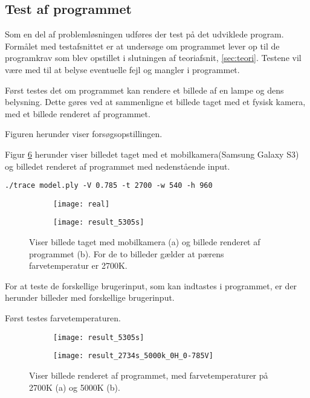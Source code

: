 \subsection{Test af programmet}
\label{sec:test}

Som en del af problemløsningen udføres der test på det udviklede program. Formålet med testafsnittet er at undersøge om programmet lever op til de programkrav som blev opstillet i slutningen af teoriafsnit, \ref{sec:teori}. Testene vil være med til at belyse eventuelle fejl og mangler i programmet.

Først testes det om programmet kan rendere et billede af en lampe og dens belysning. Dette gøres ved at sammenligne et billede taget med et fysisk kamera, med et billede renderet af programmet.

Figuren herunder viser forsøgsopstillingen.


Figur \ref{fig:test_real_fake} herunder viser billedet taget med et mobilkamera(Samsung Galaxy S3) og billedet renderet af programmet med nedenstående input.
\begin{lstlisting}
./trace model.ply -V 0.785 -t 2700 -w 540 -h 960
\end{lstlisting}

\begin{figure}[H]
\centering
\begin{subfigure}{.5\textwidth}
  \centering
  \texttt{[image: real]}
  \caption{}
  \label{fig:real}
\end{subfigure}%
\begin{subfigure}{.5\textwidth}
  \centering
  \texttt{[image: result\_5305s]}
  \caption{}
  \label{fig:fake}
\end{subfigure}
\caption{Viser billede taget med mobilkamera (a) og billede renderet af programmet (b). For de to billeder gælder at pærens farvetemperatur er 2700K.}
\label{fig:test_real_fake}
\end{figure}

For at teste de forskellige brugerinput, som kan indtastes i programmet, er der herunder billeder med forskellige brugerinput.

Først testes farvetemperaturen.
\begin{figure}[H]
\centering
\begin{subfigure}{.5\textwidth}
  \centering
  \texttt{[image: result\_5305s]}
  \caption{}
  \label{fig:real}
\end{subfigure}%
\begin{subfigure}{.5\textwidth}
  \centering
  \texttt{[image: result\_2734s\_5000k\_0H\_0-785V]}
  \caption{}
  \label{fig:fake}
\end{subfigure}
\caption{Viser billede renderet af programmet, med farvetemperaturer på 2700K (a) og 5000K (b).}
\label{fig:test_real_fake}
\end{figure}

